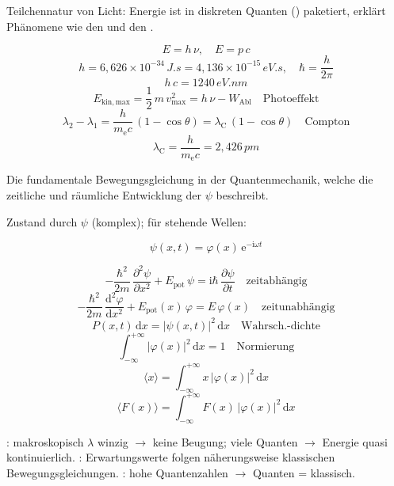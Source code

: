 \begin{runintext}
Teilchennatur von Licht: Energie ist in diskreten Quanten () paketiert, erklärt Phänomene wie den  und den .
\end{runintext}
\begin{formulabox}
\[ E = h\,\nu, \quad E = p\,c \]
\[ h = 6{,}626\times 10^{-34}\,\si{J.s} = 4{,}136\times 10^{-15}\,\si{eV.s}, \quad \hbar = \frac{h}{2\pi} \]
\[ h\,c = 1240\,\si{eV.nm} \]
\formulasep
\[ E_{\mathrm{kin},\mathrm{max}} = \frac{1}{2}\,m\,v_{\mathrm{max}}^2 = h\,\nu - W_{\mathrm{Abl}} \quad \text{Photoeffekt} \]
\formulasep
\[ \lambda_2 - \lambda_1 = \frac{h}{m_{\mathrm{e}}c}\,(1-\cos\theta) = \lambda_{\mathrm{C}}\,(1-\cos\theta) \quad \text{Compton} \]
\[ \lambda_{\mathrm{C}} = \frac{h}{m_{\mathrm{e}}c} = 2{,}426\,\si{pm} \]
\end{formulabox}

\begin{runintext}
Die fundamentale Bewegungsgleichung in der Quantenmechanik, welche die zeitliche und räumliche Entwicklung der  $\psi$ beschreibt.
\end{runintext}
\begin{runintext}
Zustand durch  $\psi$ (komplex); für stehende Wellen:
\end{runintext}
\begin{formulabox}
\[ \psi(x,t) = \varphi(x)\,\mathrm{e}^{-\mathrm{i}\omega t} \]
\end{formulabox}
\begin{formulabox}
\[ -\frac{\hbar^2}{2m}\,\frac{\partial^2\psi}{\partial x^2} + E_{\mathrm{pot}}\,\psi = \mathrm{i}\hbar\,\frac{\partial\psi}{\partial t} \quad \text{zeitabhängig} \]
\[ -\frac{\hbar^2}{2m}\,\frac{\mathrm{d}^2\varphi}{\mathrm{d}x^2} + E_{\mathrm{pot}}(x)\,\varphi = E\,\varphi(x) \quad \text{zeitunabhängig} \]
\formulasep
\[ P(x,t)\,\mathrm{d}x = |\psi(x,t)|^2\,\mathrm{d}x \quad \text{Wahrsch.-dichte} \]
\[ \int_{-\infty}^{+\infty} |\varphi(x)|^2\,\mathrm{d}x = 1 \quad \text{Normierung} \]
\formulasep
\[ \langle x \rangle = \int_{-\infty}^{+\infty} x\,|\varphi(x)|^2\,\mathrm{d}x \]
\[ \langle F(x) \rangle = \int_{-\infty}^{+\infty} F(x)\,|\varphi(x)|^2\,\mathrm{d}x \]
\end{formulabox}
\begin{runintext}
: makroskopisch $\lambda$ winzig $\to$ keine Beugung; viele Quanten $\to$ Energie quasi kontinuierlich. : Erwartungswerte folgen näherungsweise klassischen Bewegungsgleichungen. : hohe Quantenzahlen $\to$ Quanten = klassisch.
\end{runintext}
